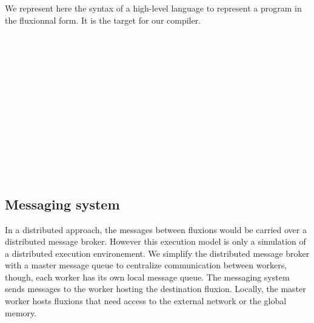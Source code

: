 We represent here the syntax of a high-level language to represent a program in the fluxionnal form.
It is the target for our compiler.
\begin{bnf*}
      { \bnfor {} \bnfsp {} \bnfsp {}}\\
          { \bnfsp {} \bnfsp {} \bnfsp {} \bnfsp {} \bnfsp {} \bnfsp {} \bnfsp {}}\\
       { \bnfsp {} \bnfor {}}\\
      { \bnfor {} \bnfor {} \bnfsp {} \bnfsp {}}\\
       { \bnfsp {} }\\
         {}\\
          {\bnfts{\texttt{\{}}  \bnfts{\texttt{\}}}}\\
          {\bnfts{\texttt{[}}  \bnfts{\texttt{]}}}\\
         { \bnfor {} \bnfsp \bnfts{,} \bnfsp {}}\\
           {\bnfts{\texttt{>}\texttt{>}} \bnfor \bnfts{\texttt{-}\texttt{>}}}\\
           {}\\
           {}\\
\end{bnf*}
\vspace{-2.5\baselineskip}


\subsection{Messaging system}

In a distributed approach, the messages between fluxions would be carried over a distributed message broker.
However this execution model is only a simulation of a distributed execution environement.
We simplify the distributed message broker with a master message queue to centralize communication between workers, though, each worker has its own local message queue.
The messaging system sends messages to the worker hosting the destination fluxion.
Locally, the master worker hosts fluxions that need access to the external network or the global memory.

